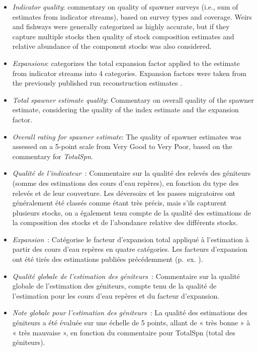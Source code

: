 \documentclass[french,11pt]{book}
\begin{document}
\begin{itemize}
\item
  \emph{Indicator quality}: commentary on quality of spawner surveys (i.e., sum of estimates from indicator streams), based on survey types and coverage. Weirs and fishways were generally categorized as highly accurate, but if they capture multiple stocks then quality of stock composition estimates and relative abundance of the component stocks was also considered.
\item
  \emph{Expansions}: categorizes the total expansion factor applied to the estimate from indicator streams into 4 categories. Expansion factors were taken from the previously published run reconstruction estimates .
\item
  \emph{Total spawner estimate quality}: Commentary on overall quality of the spawner estimate, considering the quality of the index estimate and the expansion factor.
\item
  \emph{Overall rating for spawner estimate}: The quality of spawner estimates was assessed on a 5-point scale from Very Good to Very Poor, based on the commentary for \emph{TotalSpn}.
\item
  \emph{Qualité de l'indicateur}~: Commentaire sur la qualité des relevés des géniteurs (somme des estimations des cours d'eau repères), en fonction du type des relevés et de leur couverture. Les déversoirs et les passes migratoires ont généralement été classés comme étant très précis, mais s'ils capturent plusieurs stocks, on a également tenu compte de la qualité des estimations de la composition des stocks et de l'abondance relative des différents stocks.
\item
  \emph{Expansion}~: Catégorise le facteur d'expansion total appliqué à l'estimation à partir des cours d'eau repères en quatre catégories. Les facteurs d'expansion ont été tirés des estimations publiées précédemment (p.~ex. ).
\item
  \emph{Qualité globale de l'estimation des géniteurs}~: Commentaire sur la qualité globale de l'estimation des géniteurs, compte tenu de la qualité de l'estimation pour les cours d'eau repères et du facteur d'expansion.
\item
  \emph{Note globale pour l'estimation des géniteurs}~: La qualité des estimations des géniteurs a été évaluée sur une échelle de 5 points, allant de « très bonne » à « très mauvaise », en fonction du commentaire pour TotalSpn (total des géniteurs).
\end{itemize}
\end{document}
